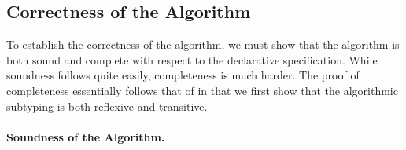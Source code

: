 
\subsection{Correctness of the Algorithm}

To establish the correctness of the algorithm, we must show that the algorithm
is both sound and complete with respect to the declarative specification. While
soundness follows quite easily, completeness is much harder. The proof of
completeness essentially follows that of \citet{pierce1989decision}
in that we
first show that the algorithmic subtyping is both reflexive and
transitive. 


\paragraph{Soundness of the Algorithm.}



